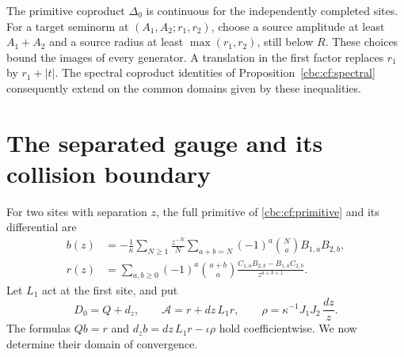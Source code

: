 The primitive coproduct $\Delta_0$ is continuous for the
independently completed sites. For a target seminorm at
$(A_1,A_2;r_1,r_2)$, choose a source amplitude at least
$A_1+A_2$ and a source radius at least
$\max(r_1,r_2)$, still below $R$. These choices bound
the images of every generator. A translation in the first
factor replaces $r_1$ by $r_1+|t|$.
The spectral coproduct identities of
Proposition~\ref{cbc:cf:spectral} consequently extend on
the common domains given by these inequalities.

\section{The separated gauge and its collision boundary}
\label{cbc:ac:gauge}

For two sites with separation $z$, the full primitive of
\eqref{cbc:cf:primitive} and its differential are
\begin{align}
 b(z)&=-\frac1\kappa\sum_{N\geq1}\frac{z^{-N}}N
              \sum_{a+b=N}(-1)^a\binom Na
                         B_{1,a}B_{2,b},
                  \label{cbc:ac:b}\\
 r(z)&=\sum_{a,b\geq0}(-1)^a\binom{a+b}{a}
        \frac{C_{1,a}B_{2,b}-B_{1,a}C_{2,b}}
                    {z^{a+b+1}}.
                  \label{cbc:ac:r}
\end{align}
Let $L_1$ act at the first site, and put
\[
 D_0=Q+d_z,\qquad
 \mathcal A=r+dz\,L_1r,\qquad
 \rho=\kappa^{-1}J_1J_2\,\frac{dz}{z}.
\]
The formulas $Qb=r$ and
$d_zb=dz\,L_1r-\iota\rho$ hold coefficientwise.
We now determine their domain of convergence.

